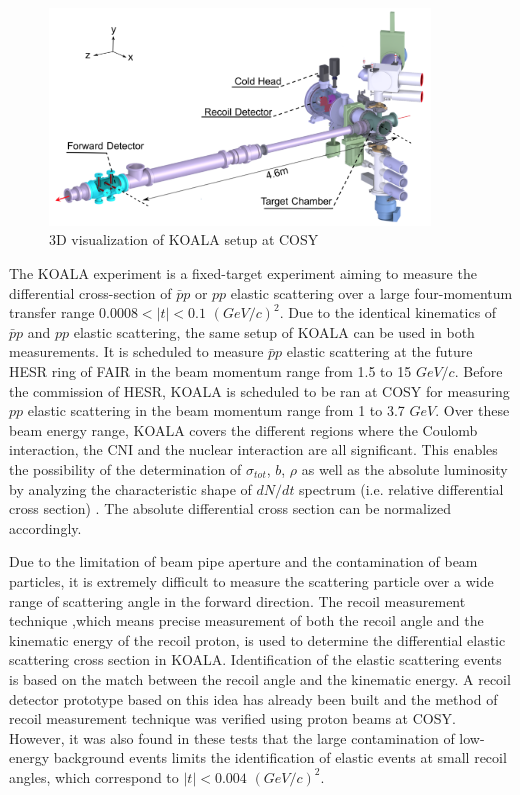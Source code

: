 \documentclass[number,5p]{elsarticle}
\begin{document}
\begin{figure}[htbp]
	\centering
	\includegraphics[width=0.9\textwidth]{./koala_setup.png}
	\caption{3D visualization of KOALA setup at COSY}
	\label{fig:setup}
\end{figure}

The KOALA experiment is a fixed-target experiment aiming to measure the
differential cross-section of $\bar{p}p$ or $pp$ elastic scattering
over a large four-momentum transfer range \(0.0008 < |t| < 0.1\) \((GeV/c)^2\).
Due to the identical kinematics of $\bar{p}p$ and $pp$ elastic scattering, the
same setup of KOALA can be used in both measurements.
It is scheduled to measure $\bar{p}p$ elastic
scattering at the future HESR ring of FAIR \cite{FAIR} in the beam momentum range from
1.5 to 15 $GeV/c$.
Before the commission of HESR, KOALA is scheduled to be ran at COSY \cite{COSY}
for measuring $pp$ elastic scattering in the beam momentum range from 1 to 3.7 $GeV$.
Over these beam energy range, KOALA covers the different regions where the Coulomb interaction, the CNI and the nuclear interaction are all significant.
This enables the possibility of the determination of \({\sigma}_{tot}\), \(b\), \(\rho\) as well as
the absolute luminosity by analyzing the characteristic shape of $dN/dt$
spectrum (i.e. relative differential cross section) \cite{bernard1987real,
  jenni2008atlas, recoil_article}.
The absolute differential cross section can be normalized accordingly.

Due to the limitation of beam pipe aperture and the contamination of beam particles,
it is extremely difficult to measure the scattering particle over a wide range of scattering angle in the forward direction.
The recoil measurement technique ,which means precise measurement of  both the recoil angle and the kinematic energy of the recoil proton, 
is used to determine the differential elastic scattering cross section in KOALA.
Identification of the elastic scattering events is based on the match between the recoil angle and the kinematic energy.
A recoil detector prototype based on this idea has already been built
\cite{recoil_article} and the method of recoil measurement technique was verified using proton beams at COSY.
However, it was also found in these tests that the large contamination of low-energy background events limits the identification of elastic events at small recoil angles,
which correspond to \(|t| < 0.004\) \((GeV/c)^2\).
\end{document}
